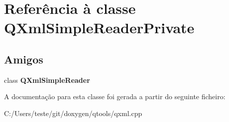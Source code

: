 \hypertarget{class_q_xml_simple_reader_private}{\section{Referência à classe Q\-Xml\-Simple\-Reader\-Private}
\label{class_q_xml_simple_reader_private}
}
\subsection*{Amigos}
\begin{DoxyCompactItemize}
\item 
\hypertarget{class_q_xml_simple_reader_private_aba6d8e1fe7917a5056b07bf8d4b4e53c}{class {\bfseries Q\-Xml\-Simple\-Reader}}\label{class_q_xml_simple_reader_private_aba6d8e1fe7917a5056b07bf8d4b4e53c}

\end{DoxyCompactItemize}


A documentação para esta classe foi gerada a partir do seguinte ficheiro\-:\begin{DoxyCompactItemize}
\item 
C\-:/\-Users/teste/git/doxygen/qtools/qxml.\-cpp\end{DoxyCompactItemize}
